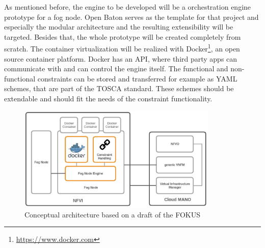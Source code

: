 
As mentioned before, the engine to be developed will be a orchestration engine prototype for a fog node.
Open Baton serves as the template for that project and especially the modular architecture and the resulting extensibility will be targeted.
Besides that, the whole prototype will be created completely from scratch.
The container virtualization will be realized with Docker\footnote{\url{https://www.docker.com}}, an open source container platform.
Docker has an \ac{API}, where third party apps can communicate with and can control the engine itself.
The functional and non-functional constraints can be stored and transferred for example as \ac{YAML} schemes, that are part of the \ac{TOSCA} standard.
These schemes should be extendable and should fit the needs of the constraint functionality.

\begin{figure}[H]
    \centering
    \includegraphics[width=0.85\textwidth]{resources/images/conceptual_architecture.png}
    \caption[Conceptual architecture based on a draft of the FOKUS]{Conceptual architecture based on a draft of the \ac{FOKUS}}
    \label{fig:conceptual_architecture}
\end{figure}

